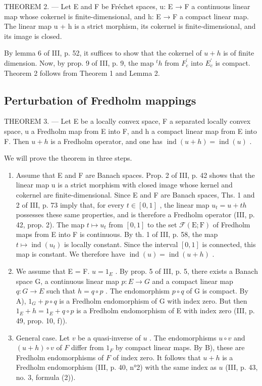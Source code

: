 THEOREM 2. --- Let E and F be Fréchet spaces, u: E → F a continuous linear map whose cokernel is finite-dimensional, and h: E → F a compact linear map. The linear map u + h is a strict morphism, its cokernel is finite-dimensional, and its image is closed.

By lemma 6 of III, p. 52, it suffices to show that the cokernel of \(u + h\) is of finite dimension. Now, by prop. 9 of III, p. 9, the map \(^{t}h\) from \(F_{c}^{\prime}\) into \(E_{c}^{\prime}\) is compact. Theorem 2 follows from Theorem 1 and Lemma 2.

\subsection{Perturbation of Fredholm mappings}

THEOREM 3. --- Let E be a locally convex space, F a separated locally convex space, u a Fredholm map from E into F, and h a compact linear map from E into F. Then \(u + h\) is a Fredholm operator, and one has \(\operatorname{ind}(u + h) = \operatorname{ind}(u)\) .

We will prove the theorem in three steps.

\begin{enumerate}
\def\labelenumi{\Alph{enumi})}
\item
  Assume that E and F are Banach spaces. Prop. 2 of III, p. 42 shows that the linear map u is a strict morphism with closed image whose kernel and cokernel are finite-dimensional. Since E and F are Banach spaces, Ths. 1 and 2 of III, p. 73 imply that, for every \(t \in [0,1]\) , the linear map \(u_t = u + th\) possesses these same properties, and is therefore a Fredholm operator (III, p. 42, prop. 2). The map \(t \mapsto u_t\) from \([0,1]\) to the set \(\mathcal{F}(\mathrm{E};\mathrm{F})\) of Fredholm maps from E into F is continuous. By th. 1 of III, p. 58, the map \(t \mapsto \operatorname{ind}(u_t)\) is locally constant. Since the interval \([0,1]\) is connected, this map is constant. We therefore have \(\operatorname{ind}(u) = \operatorname{ind}(u + h)\) .
\item
  We assume that E = F. \(u = 1_{E}\) . By prop. 5 of III, p. 5, there exists a Banach space G, a continuous linear map \(p: E \to G\) and a compact linear map \(q: G \to E\) such that \(h = q \circ p\) . The endomorphism \(p \circ q\) of G is compact. By A), \(1_{G} + p \circ q\) is a Fredholm endomorphism of G with index zero. But then \(1_{E} + h = 1_{E} + q \circ p\) is a Fredholm endomorphism of E with index zero (III, p. 49, prop. 10, f)).
\item
  General case. Let \(v\) be a quasi-inverse of \(u\) . The endomorphisms \(u \circ v\) and \((u + h) \circ v\) of \(F\) differ from \(1_{F}\) by compact linear maps. By B), these are Fredholm endomorphisms of \(F\) of index zero. It follows that \(u + h\) is a Fredholm endomorphism (III, p. 40, n°2) with the same index as \(u\) (III, p. 43, no. 3, formula (2)).
\end{enumerate}

